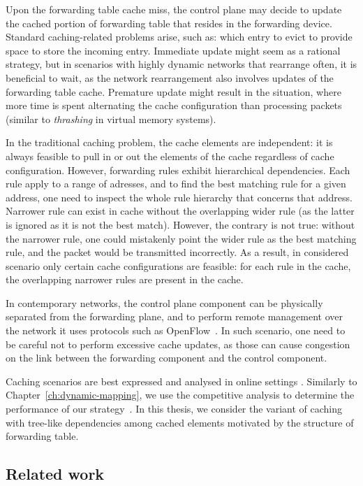 Upon the forwarding table cache miss, the control plane may decide to update the cached portion of forwarding table that resides in the forwarding device.
Standard caching-related problems arise, such as: which entry to evict to provide space to store the incoming entry.
Immediate update might seem as a rational strategy, but in scenarios with highly dynamic networks that rearrange often, it is beneficial to wait, as the network rearrangement also involves updates of the forwarding table cache.
Premature update might result in the situation, where more time is spent alternating the cache configuration than processing packets (similar to \emph{thrashing} in virtual memory systems).

In the traditional caching problem, the cache elements are independent: it is always feasible to pull in or out the elements of the cache regardless of cache configuration.
However, forwarding rules exhibit hierarchical dependencies.
Each rule apply to a range of adresses, and to find the best matching rule for a given address, one need to inspect the whole rule hierarchy that concerns that address.
Narrower rule can exist in cache without the overlapping wider rule (as the latter is ignored as it is not the best match).
However, the contrary is not true: without the narrower rule, one could mistakenly point the wider rule as the best matching rule, and the packet would be transmitted incorrectly.
As a result, in considered scenario only certain cache configurations are feasible: for each rule in the cache, the overlapping narrower rules are present in the cache.


In contemporary networks, the control plane component can be physically separated from the forwarding plane, and to perform remote management over the network it uses protocols such as OpenFlow~\cite{openflow}.
In such scenario, one need to be careful not to perform excessive cache updates, as those can cause congestion on the link between the forwarding component and the control component.

Caching scenarios are best expressed and analysed in online settings \cite{borodin-book}.
Similarly to Chapter~\ref{ch:dynamic-mapping}, we use the competitive analysis to determine the performance of our strategy~\cite{competitive-analysis}.
In this thesis, we consider the variant of caching with tree-like dependencies among cached elements motivated by the structure of forwarding table.

\subsection{Related work}

